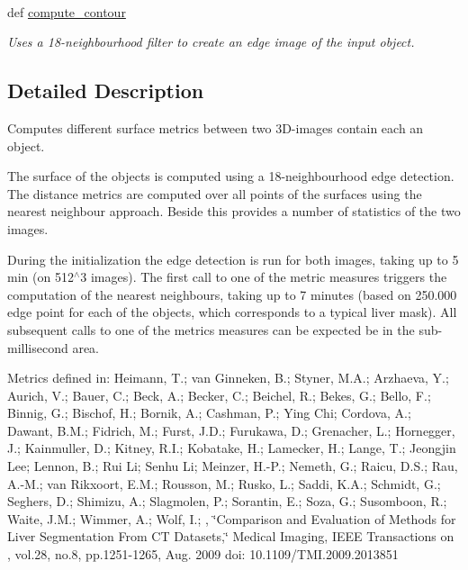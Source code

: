 \paragraph*{}
\begin{DoxyCompactItemize}
\item 
def \hyperlink{classmedpy_1_1metric_1_1surface_1_1Surface_aee3d28744eeac497b32362ba5ef9f8bb}{compute\_\-contour}
\begin{DoxyCompactList}\small\item\em Uses a 18-\/neighbourhood filter to create an edge image of the input object. \end{DoxyCompactList}\end{DoxyCompactItemize}



\subsection{Detailed Description}
Computes different surface metrics between two 3D-\/images contain each an object. 

The surface of the objects is computed using a 18-\/neighbourhood edge detection. The distance metrics are computed over all points of the surfaces using the nearest neighbour approach. Beside this provides a number of statistics of the two images.

During the initialization the edge detection is run for both images, taking up to 5 min (on 512$^\wedge$3 images). The first call to one of the metric measures triggers the computation of the nearest neighbours, taking up to 7 minutes (based on 250.000 edge point for each of the objects, which corresponds to a typical liver mask). All subsequent calls to one of the metrics measures can be expected be in the sub-\/millisecond area.

Metrics defined in: Heimann, T.; van Ginneken, B.; Styner, M.A.; Arzhaeva, Y.; Aurich, V.; Bauer, C.; Beck, A.; Becker, C.; Beichel, R.; Bekes, G.; Bello, F.; Binnig, G.; Bischof, H.; Bornik, A.; Cashman, P.; Ying Chi; Cordova, A.; Dawant, B.M.; Fidrich, M.; Furst, J.D.; Furukawa, D.; Grenacher, L.; Hornegger, J.; Kainmuller, D.; Kitney, R.I.; Kobatake, H.; Lamecker, H.; Lange, T.; Jeongjin Lee; Lennon, B.; Rui Li; Senhu Li; Meinzer, H.-\/P.; Nemeth, G.; Raicu, D.S.; Rau, A.-\/M.; van Rikxoort, E.M.; Rousson, M.; Rusko, L.; Saddi, K.A.; Schmidt, G.; Seghers, D.; Shimizu, A.; Slagmolen, P.; Sorantin, E.; Soza, G.; Susomboon, R.; Waite, J.M.; Wimmer, A.; Wolf, I.; , \char`\"{}Comparison and Evaluation of Methods for Liver Segmentation From CT Datasets,\char`\"{} Medical Imaging, IEEE Transactions on , vol.28, no.8, pp.1251-\/1265, Aug. 2009 doi: 10.1109/TMI.2009.2013851 

